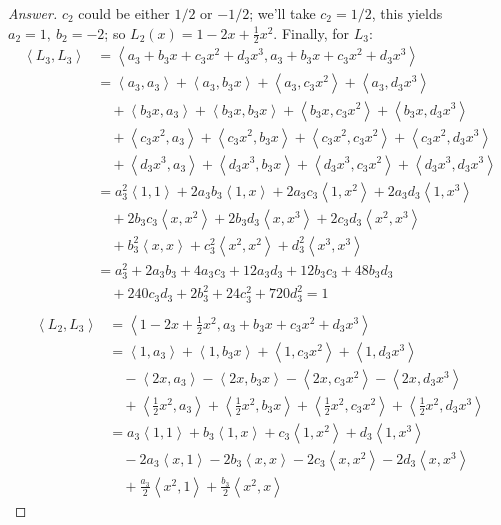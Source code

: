 \documentclass{article}
\newcommand{\abracks}[1]{\left< #1\right>}
\begin{document}
\begin{proof}[Answer]
    $c_2$ could be either $1/2$ or $-1/2$; we'll take $c_2 = 1/2$, this yields $a_2 = 1,\ b_2 =
    -2$; so $L_2(x) = 1 - 2x + \frac{1}{2}x^2$. Finally, for $L_3$:
    \begin{align*}
    \abracks{L_3, L_3} &= \abracks{a_3 + b_3x + c_3x^2 + d_3x^3, a_3 + b_3x + c_3x^2 + d_3x^3}\\
    &= \abracks{a_3, a_3} + \abracks{a_3, b_3x} + \abracks{a_3, c_3x^2} + 
    \abracks{a_3, d_3x^3} \\
    &\quad + \abracks{b_3x, a_3} + \abracks{b_3x, b_3x} + \abracks{b_3x, c_3x^2} 
    + \abracks{b_3x, d_3x^3} \\
    &\quad + \abracks{c_3x^2, a_3} + \abracks{c_3x^2, b_3x} + \abracks{c_3x^2, c_3x^2} 
    + \abracks{c_3x^2, d_3x^3} \\
    &\quad + \abracks{d_3x^3, a_3} + \abracks{d_3x^3, b_3x} + \abracks{d_3x^3, c_3x^2} 
    + \abracks{d_3x^3, d_3x^3} \\
    &= a_3^2\abracks{1,1} + 2a_3b_3\abracks{1,x} + 2a_3c_3\abracks{1,x^2} + 2a_3d_3
    \abracks{1,x^3} \\
    &\quad + 2b_3c_3\abracks{x,x^2} + 2b_3d_3\abracks{x, x^3} + 2c_3d_3\abracks{x^2, x^3} \\
    &\quad + b_3^2\abracks{x,x} + c_3^2\abracks{x^2,x^2} + d_3^2\abracks{x^3,x^3} \\
    &= a_3^2 + 2a_3b_3 + 4a_3c_3 + 12a_3d_3 + 12b_3c_3 + 48b_3d_3 \\
    &\quad + 240c_3d_3 + 2b_3^2 + 24c_3^2 + 720d_3^2 = 1 \\
    \end{align*}
    \begin{align*}
    \abracks{L_2, L_3} &= \abracks{1 - 2x + \frac{1}{2}x^2, a_3 + b_3x + c_3x^2 + d_3x^3} \\
    &= \abracks{1, a_3} + \abracks{1, b_3x} + \abracks{1, c_3x^2} + \abracks{1, d_3x^3} \\
    &\quad - \abracks{2x, a_3} - \abracks{2x, b_3x} - \abracks{2x, c_3x^2} - 
    \abracks{2x, d_3x^3} \\
    &\quad + \abracks{\frac{1}{2}x^2, a_3} + \abracks{\frac{1}{2}x^2, b_3x} 
    + \abracks{\frac{1}{2}x^2, c_3x^2} + \abracks{\frac{1}{2}x^2, d_3x^3} \\
    &= a_3\abracks{1, 1} + b_3\abracks{1, x} + c_3\abracks{1, x^2} + d_3\abracks{1, x^3} \\
    &\quad - 2a_3\abracks{x, 1} - 2b_3\abracks{x, x} - 2c_3\abracks{x, x^2} - 
    2d_3\abracks{x, x^3} \\
    &\quad + \frac{a_3}{2}\abracks{x^2, 1} + \frac{b_3}{2}\abracks{x^2, x} 

\end{align*}
\end{proof}
\end{document}
